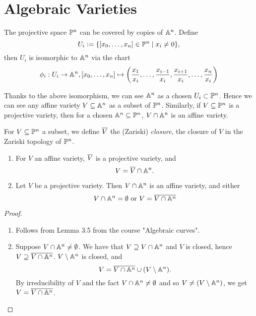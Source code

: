 \section{Algebraic Varieties}

The projective space $\mathbb{P}^n$ can be covered by copies of $\mathbb{A}^n$. Define
\begin{equation*}
	U_i := \{[x_0, \dots, x_n] \in \mathbb{P}^n \mid x_i \neq 0\},
\end{equation*}
then $U_i$ is isomorphic to $\mathbb{A}^n$ via the chart
\begin{equation*}
	\phi_i: U_i \to \mathbb{A}^n, [x_0, \dots, x_n] \mapsto \left(\frac{x_1}{x_i}, \dots,
		\frac{x_{i-1}}{x_i}, \frac{x_{i+1}}{x_i}, \dots, 
		\frac{x_n}{x_i}\right)
\end{equation*}

\begin{notation}
	Thanks to the above isomorphism, we can see $\mathbb{A}^n$ as a chosen
	$U_i \subset \mathbb{P}^n$. Hence we can see any affine variety
	$V \subseteq \mathbb{A}^n$ as a subset of $\mathbb{P}^n$. Similarly, if $V \subseteq
	\mathbb{P}^n$ is a projective variety, then for a chosen $\mathbb{A}^n \subseteq \mathbb{P}^n$,
	$V \cap \mathbb{A}^n$ is an affine variety.
\end{notation}

\begin{definition}
	For $V \subseteq \mathbb{P}^n$ a subset, we define $\overline{V}$ the (Zariski)
	\emph{closure}, the closure of $V$ in the Zariski topology of $\mathbb{P}^n$.
\end{definition}

\begin{proposition}
	\begin{enumerate}
		\item For $V$ an affine variety, $\overline{V}$ is a projective variety, and
		\begin{equation*}
			V = \overline{V} \cap \mathbb{A}^n.
		\end{equation*}
		\item Let $V$ be a projective variety. Then $V \cap \mathbb{A}^n$ is an affine
			variety, and either
			\begin{equation*}
				V \cap \mathbb{A}^n = \emptyset
				\textrm{ or }
				V = \overline{V \cap \mathbb{A}^n}
			\end{equation*}
	\end{enumerate}
\end{proposition}

\begin{proof}
	\begin{enumerate}
		\item Follows from Lemma 3.5 from the course "Algebraic curves".
		\item Suppose $V \cap \mathbb{A}^n \neq \emptyset$. We have that
			$V \supseteq V \cap \mathbb{A}^n$ and $V$ is closed, hence
			$V \supseteq \overline{V \cap \mathbb{A}^n}$.
			$V \setminus \mathbb{A}^n$ is closed, and
			\begin{equation*}
				V = \overline{V \cap \mathbb{A}^n} \cup (V \setminus \mathbb{A}^n).
			\end{equation*}
			By irreducibility of $V$ and the fact $V \cap \mathbb{A}^n \neq \emptyset$
			and so $V \neq (V \setminus \mathbb{A}^n)$, we get $V = \overline{V \cap \mathbb{A}^n}$.
	\end{enumerate}
\end{proof}

